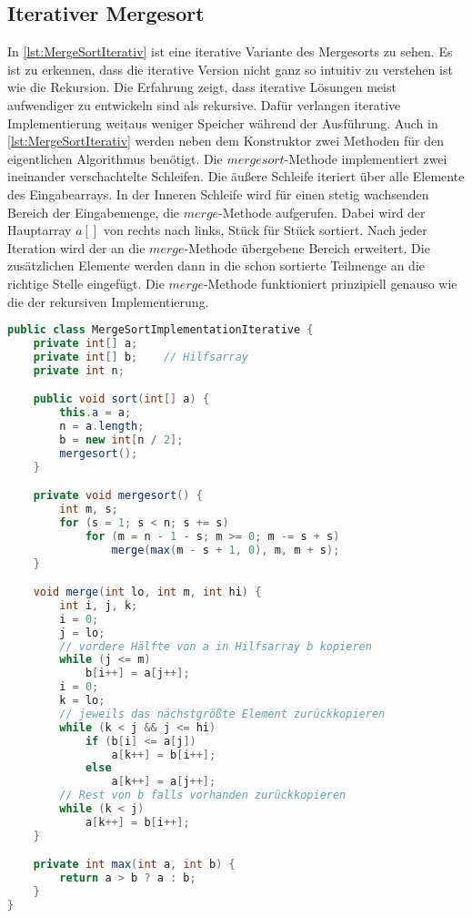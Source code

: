 \subsection{Iterativer Mergesort}

In \autoref{lst:MergeSortIterativ} ist eine iterative Variante des Mergesorts zu sehen. Es ist zu erkennen, dass die iterative Version nicht ganz so intuitiv zu verstehen ist wie die Rekursion. Die Erfahrung zeigt, dass iterative Lösungen meist aufwendiger zu entwickeln sind als rekursive. Dafür verlangen iterative Implementierung weitaus weniger Speicher während der Ausführung. Auch in \autoref{lst:MergeSortIterativ} werden neben dem Konstruktor zwei Methoden für den eigentlichen Algorithmus benötigt. Die $mergesort$-Methode implementiert zwei ineinander verschachtelte Schleifen. Die äußere Schleife iteriert über alle Elemente des Eingabearrays. In der Inneren Schleife wird für einen stetig wachsenden Bereich der Eingabemenge, die $merge$-Methode aufgerufen. Dabei wird der Hauptarray $a[]$ von rechts nach links, Stück für Stück sortiert. Nach jeder Iteration wird der an  die $merge$-Methode übergebene Bereich erweitert. Die zusätzlichen Elemente werden dann in die schon sortierte Teilmenge an die richtige Stelle eingefügt. Die $merge$-Methode funktioniert prinzipiell genauso wie die der rekursiven Implementierung.

\begin{lstlisting}[language=java,caption={iterativer Mergesort (Quelle: \cite{MergeSortIterativ})},label=lst:MergeSortIterativ]
public class MergeSortImplementationIterative {
    private int[] a;
    private int[] b;    // Hilfsarray
    private int n;

    public void sort(int[] a) {
        this.a = a;
        n = a.length;
        b = new int[n / 2];
        mergesort();
    }

    private void mergesort() {
        int m, s;
        for (s = 1; s < n; s += s)
            for (m = n - 1 - s; m >= 0; m -= s + s)
                merge(max(m - s + 1, 0), m, m + s);
    }

    void merge(int lo, int m, int hi) {
        int i, j, k;
        i = 0;
        j = lo;
        // vordere Hälfte von a in Hilfsarray b kopieren
        while (j <= m)
            b[i++] = a[j++];
        i = 0;
        k = lo;
        // jeweils das nächstgrößte Element zurückkopieren
        while (k < j && j <= hi)
            if (b[i] <= a[j])
                a[k++] = b[i++];
            else
                a[k++] = a[j++];
        // Rest von b falls vorhanden zurückkopieren
        while (k < j)
            a[k++] = b[i++];
    }

    private int max(int a, int b) {
        return a > b ? a : b;
    }
}
\end{lstlisting}
